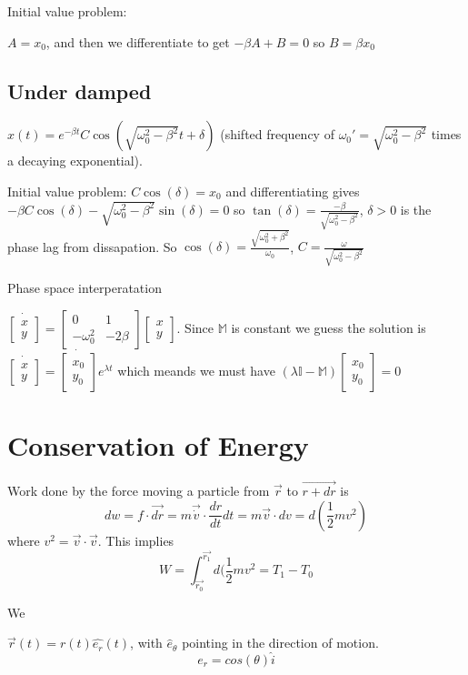\documentclass{homework}
\newcommand{\MM}{\mathbb{M}}
\newcommand{\m}[1]{\begin{bmatrix} #1 \end{bmatrix}}
\begin{document}
Initial value problem:

$A = x_0$, and then we differentiate to get $-\beta A + B = 0$ so $B = \beta x_0$

\subsection{Under damped}
$x(t) = e^{-\beta t}C \cos(\sqrt{\omega_0^2 - \beta^2}t + \delta)$ (shifted frequency of $\omega_0'  = \sqrt{\omega_0^2 - \beta^2}$ times a decaying exponential).


Initial value problem: $C\cos(\delta) = x_0$ and differentiating gives $-\beta C \cos (\delta) - \sqrt{\omega_0^2 - \beta^2}\sin (\delta) =0$ so $\tan(\delta) = \frac{-\beta}{\sqrt{\omega_0^2 - \beta^2}}$, $\delta >0$ is the phase lag from dissapation. So $\cos (\delta) = \frac{\sqrt{\omega_0^2 + \beta^2}}{\omega_0}$, $C = \frac{\omega}{\sqrt{\omega_0^2 - \beta^2}}$



Phase space interperatation

$\dot{\m{x \\ y}} = \m{0 & 1 \\ -\omega_0^2 & -2\beta} \m{x \\ y}$. Since $\MM$ is constant we guess the solution is $\dot{\m{x \\ y}} = \dot{\m{x_0 \\ y_0}}e^{\lambda t}$ which meands we must have $(\lambda \mathbb{I} - \mathbb{M})\m{x_0 \\ y_0} = 0$






\section{Conservation of Energy}

Work done by the force moving a particle from $\vec{r}$ to $\vec{r + dr}$ is 
\[dw = f\cdot \vec{dr} = m\vec{\dot{v}} \cdot \frac{dr}{dt}dt = m\vec{v} \cdot dv = d(\frac{1}{2}mv^2) \]
where $v^2 = \vec{v} \cdot \vec{v}$. This implies 
\[W = \int_{\vec{r_0}}^{\vec{r_1}}d(\frac{1}{2}mv^2 = T_1 - T_0 \]





We 





$\vec{r}(t) = r(t)\hat{e_r}(t)$, with $\hat e_{\theta}$ pointing in the direction of motion.
\[e_r = cos(\theta)\hat i\]
\end{document}
